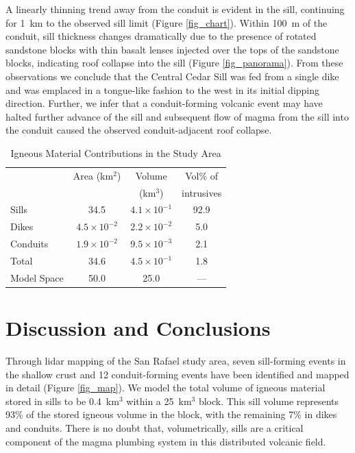 \documentclass[12pt,letter]{article}
\begin{document}
A linearly thinning trend away from the conduit is evident in the sill, continuing for 1~km to the observed sill limit (Figure \ref{fig_chart}). Within 100~m of the conduit, sill thickness changes dramatically due to the presence of rotated sandstone blocks with thin basalt lenses injected over the tops of the sandstone blocks, indicating roof collapse into the sill (Figure \ref{fig_panorama}). From these observations we conclude that the Central Cedar Sill was fed from a single dike and was emplaced in a tongue-like fashion to the west in its initial dipping direction. Further, we infer that a conduit-forming volcanic event may have halted further advance of the sill and subsequent flow of magma from the sill into the conduit caused the observed conduit-adjacent roof collapse.

\begin{table}
\centering
\caption{Igneous Material Contributions in the Study Area}
\begin{tabular}{l c c c}
\toprule
 & Area (km$^2$) & Volume  & Vol\% of  \\
 & & (km$^3$) & intrusives \\
\midrule
 Sills & 34.5 & $4.1 \times 10^{-1}$ & 92.9 \\ 
 Dikes & $4.5 \times 10^{-2}$ & $2.2 \times 10^{-2}$ & 5.0 \\
 Conduits & $1.9 \times 10^{-2}$ & $9.5 \times 10^{-3}$ & 2.1 \\
 Total & 34.6 & $4.5 \times 10^{-1}$ & 1.8 \\
 Model Space & 50.0 & 25.0 & --- \\
\bottomrule
\end{tabular}
\label{tab_contribs}
\end{table}

\section{Discussion and Conclusions}

Through lidar mapping of the San Rafael study area, seven sill-forming events in the shallow crust and 12 conduit-forming events have been identified and mapped in detail (Figure \ref{fig_map}). We model the total volume of igneous material stored in sills to be 0.4~km$^3$ within a 25~km$^3$ block. This sill volume represents 93\% of the stored igneous volume in the block, with the remaining 7\% in dikes and conduits. There is no doubt that, volumetrically, sills are a critical component of the magma plumbing system in this distributed volcanic field.
\end{document}
